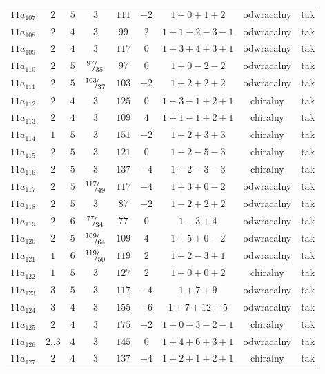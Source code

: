 \begin{longtable}{ccccccccc}
$11a_{107}$ & $2$ & $5$ & $3$ & $111$ & $-2$ & $1+0+1+2$ & odwracalny & tak \\
$11a_{108}$ & $2$ & $4$ & $3$ & $99$ & $2$ & $1+1-2-3-1$ & odwracalny & tak \\
$11a_{109}$ & $2$ & $4$ & $3$ & $117$ & $0$ & $1+3+4+3+1$ & odwracalny & tak \\
$11a_{110}$ & $2$ & $5$ & ${}^{97}{\mskip -5mu/\mskip -3mu}_{35}$ & $97$ & $0$ & $1+0-2-2$ & odwracalny & tak \\
$11a_{111}$ & $2$ & $5$ & ${}^{103}{\mskip -5mu/\mskip -3mu}_{37}$ & $103$ & $-2$ & $1+2+2+2$ & odwracalny & tak \\
$11a_{112}$ & $2$ & $4$ & $3$ & $125$ & $0$ & $1-3-1+2+1$ & chiralny & tak \\
$11a_{113}$ & $2$ & $4$ & $3$ & $109$ & $4$ & $1+1-1+2+1$ & chiralny & tak \\
$11a_{114}$ & $1$ & $5$ & $3$ & $151$ & $-2$ & $1+2+3+3$ & chiralny & tak \\
$11a_{115}$ & $2$ & $5$ & $3$ & $121$ & $0$ & $1-2-5-3$ & chiralny & tak \\
$11a_{116}$ & $2$ & $5$ & $3$ & $137$ & $-4$ & $1+2-3-3$ & chiralny & tak \\
$11a_{117}$ & $2$ & $5$ & ${}^{117}{\mskip -5mu/\mskip -3mu}_{49}$ & $117$ & $-4$ & $1+3+0-2$ & odwracalny & tak \\
$11a_{118}$ & $2$ & $5$ & $3$ & $87$ & $-2$ & $1-2+2+2$ & odwracalny & tak \\
$11a_{119}$ & $2$ & $6$ & ${}^{77}{\mskip -5mu/\mskip -3mu}_{34}$ & $77$ & $0$ & $1-3+4$ & odwracalny & tak \\
$11a_{120}$ & $2$ & $5$ & ${}^{109}{\mskip -5mu/\mskip -3mu}_{64}$ & $109$ & $4$ & $1+5+0-2$ & odwracalny & tak \\
$11a_{121}$ & $1$ & $6$ & ${}^{119}{\mskip -5mu/\mskip -3mu}_{50}$ & $119$ & $2$ & $1+2-3+1$ & odwracalny & tak \\
$11a_{122}$ & $1$ & $5$ & $3$ & $127$ & $2$ & $1+0+0+2$ & chiralny & tak \\
$11a_{123}$ & $3$ & $5$ & $3$ & $117$ & $-4$ & $1+7+9$ & odwracalny & tak \\
$11a_{124}$ & $3$ & $4$ & $3$ & $155$ & $-6$ & $1+7+12+5$ & odwracalny & tak \\
$11a_{125}$ & $2$ & $4$ & $3$ & $175$ & $-2$ & $1+0-3-2-1$ & chiralny & tak \\
$11a_{126}$ & $2..3$ & $4$ & $3$ & $145$ & $0$ & $1+4+6+3+1$ & odwracalny & tak \\
$11a_{127}$ & $2$ & $4$ & $3$ & $137$ & $-4$ & $1+2+1+2+1$ & chiralny & tak \\

\end{longtable}
